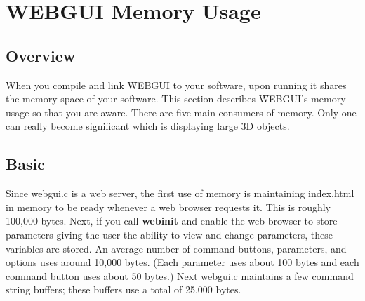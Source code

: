 \cleardoublepage
\setcounter{chapter}{4} %
\setcounter{section}{5} %
\chapter{WEBGUI Memory Usage}
\setcounter{page}{47} %

 
\section{Overview}
\label{sec:5-1}
When you compile and link \f{WEBGUI} to your software, upon running it shares the memory space of your software.
This section describes \f{WEBGUI}'s memory usage so that you are aware. There are five main consumers of memory.
Only one can really become significant which is displaying large 3D objects. 

\section{Basic}
Since webgui.c is a web server, the first use of memory is maintaining index.html in memory
to be ready whenever a web browser requests it. This is roughly 100,000 bytes. Next, if you call \textbf{webinit} and enable the
web browser to store parameters giving the user the ability to view and change parameters, these variables are stored. An average number
of command buttons, parameters, and options uses around 10,000 bytes. (Each parameter uses about 100 bytes and each command button 
uses about 50 bytes.) Next webgui.c maintains a few command string buffers; these buffers use a total of 25,000 bytes.

